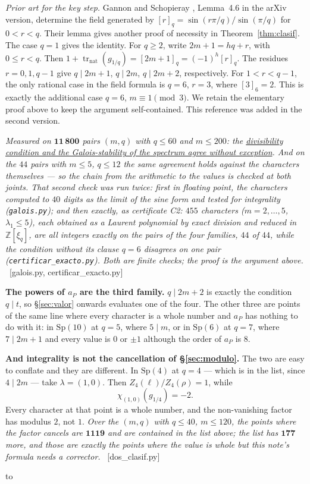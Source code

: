 \documentclass[11pt,a4paper]{article}
\theoremstyle{definition}
\newcommand{\Sp}{\mathrm{Sp}}
\newcommand{\ZZ}{\mathbb{Z}}
\newcommand{\ver}[1]{\unskip\penalty0\ \textcolor{azul}{\small\textsf{[#1]}}}
\newenvironment{keybox}
  {\par\vspace{9pt}\begin{lrbox}{\fichabox}%
   \begin{minipage}{0.90\textwidth}\vspace{7pt}\setlength{\parskip}{3pt}}
  {\vspace{7pt}\end{minipage}\end{lrbox}%
   \par\noindent\hbox to \textwidth{\hfill
   \textcolor{azul}{\rule[-\dp\fichabox]{3.2pt}{\dimexpr\ht\fichabox+\dp\fichabox\relax}}%
   \colorbox{fondoficha}{\usebox{\fichabox}}\hfill}%
   \par\vspace{9pt}}
\begin{document}
\noindent\emph{Prior art for the key step.} Gannon and Schopieray \cite{GS19}, Lemma~4.6 in the arXiv version, determine the field generated by $[r]_q=\sin(r\pi/q)/\sin(\pi/q)$ for $0<r<q$. Their lemma gives another proof of necessity in Theorem~\ref{thm:clasif}. The case $q=1$ gives the identity. For $q\ge2$, write $2m+1=hq+r$, with $0\le r<q$. Then $1+\operatorname{tr}_{\mathrm{nat}}(g_{1/q})=[2m+1]_q=(-1)^h[r]_q$. The residues $r=0,1,q-1$ give $q\mid 2m+1$, $q\mid 2m$, $q\mid 2m+2$, respectively. For $1<r<q-1$, the only rational case in the field formula is $q=6$, $r=3$, where $[3]_6=2$. This is exactly the additional case $q=6$, $m\equiv1\pmod3$. We retain the elementary proof above to keep the argument self-contained. This reference was added in the second version.

\noindent \emph{Measured on $\mathbf{11\,800}$ pairs $(m,q)$ with $q\le60$ and $m\le200$: the
\href{https://karlesmarin.github.io/blueprints/characters-at-aP/index.html?lab=thm\%3Aclasif\#thm:clasif}{divisibility condition and the Galois-stability of the spectrum agree without exception}. And on the
$44$ pairs with $m\le5$, $q\le12$ the same agreement holds against the characters themselves ---
so the chain from the arithmetic to the values is checked at both joints. That second check was
run twice: first in floating point, the characters computed to $40$ digits as the limit of the
sine form and tested for integrality \textup{(}\texttt{galois.py}\textup{)}; and then exactly, as
certificate C2: $455$ characters ($m=2,\dots,5$, $\lambda_1\le5$), each obtained as a Laurent
polynomial by exact division and reduced in $\ZZ[\xi_q]$, are all integers exactly on the pairs of
the four families, $44$ of $44$, while the condition without its clause $q=6$ disagrees on one
pair \textup{(}\texttt{certificar\_exacto.py}\textup{)}. Both are finite checks; the proof is the
argument above.} \ver{galois.py, certificar\_exacto.py}

\begin{keybox}
\textbf{The powers of $a_P$ are the third family.} $q\mid 2m+2$ is exactly the condition
$q\mid t$, so \S\ref{sec:valor} onwards evaluates one of the four. The other three are points of
the same line where every character is a whole number and $a_P$ has nothing to do with it: in
$\Sp(10)$ at $q=5$, where $5\mid m$, or in $\Sp(6)$ at $q=7$, where $7\mid 2m+1$ and every value is
$0$ or $\pm1$ although the order of $a_P$ is $8$.

\smallskip
\textbf{And integrality is not the cancellation of \S\ref{sec:modulo}.} The two are easy to
conflate and they are different. In $\Sp(4)$ at $q=4$ --- which is in the list, since $4\mid 2m$ ---
take $\lambda=(1,0)$. Then $Z_4(\ell)/Z_4(\rho)=1$, while
\[
\chi_{(1,0)}(g_{1/4})=-2 .
\]
Every character at that point is a whole number, and the non-vanishing factor has modulus $2$, not
$1$. \emph{Over the $(m,q)$ with $q\le40$, $m\le120$, the points where the factor cancels are
$\mathbf{1119}$ and are contained in the list above; the list has $\mathbf{177}$ more, and those are
exactly the points where the value is whole but this note's formula needs a corrector.}
\ver{dos\_clasif.py}
\end{keybox}
\end{document}
